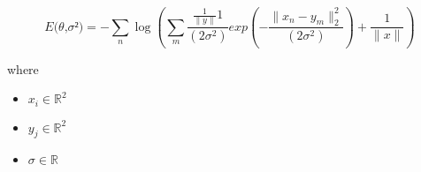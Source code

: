 \documentclass[12pt]{article}
\begin{document}
\[
\textit{E(θ,σ²)} = -\sum_\textit{n}  \log{(\sum_\textit{m} \frac{\frac{1}{\|\textit{y}\|}1}{(2\textit{σ}^{2})}exp(-\frac{\|\textit{x}_{ \textit{n} } - \textit{y}_{ \textit{m} }\|_2^{2}}{(2\textit{σ}^{2})}) + \frac{1}{\|\textit{x}\|})}
\]

where
\begin{itemize}
\item $\textit{x}_{\textit{i}} \in \mathbb{R}^{ 2}$
\item $\textit{y}_{\textit{j}} \in \mathbb{R}^{ 2}$
\item $\textit{σ} \in \mathbb{{R}}$
\end{itemize}
\end{document}
